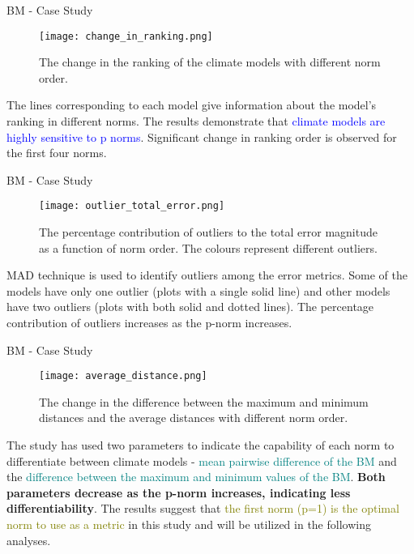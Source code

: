 \documentclass[xcolor={dvipsnames}]{beamer}
\begin{document}
\begin{frame}{BM - Case Study}
\begin{minipage}{0.5\textwidth}
\begin{figure}
    \centering
    \texttt{[image: change\_in\_ranking.png]}
    \captionsetup{font=scriptsize} 
    \caption{The change in the ranking of the climate models with different norm order.}
    \label{fig:change_in_ranking}
\end{figure}
\end{minipage}%
\begin{minipage}{0.5\textwidth}
The lines corresponding to each model give information about the model’s ranking in different norms. The results demonstrate that \textcolor{blue}{climate models are highly sensitive to p norms}. Significant change in ranking order is observed for the first four norms.
\end{minipage}
\end{frame}

\begin{frame}{BM - Case Study}

\begin{figure}
  \centering
  \texttt{[image: outlier\_total\_error.png]}
  \captionsetup{font=scriptsize, skip=0pt, belowskip=-10pt}  
  \caption{The percentage contribution of outliers to the total error magnitude as a function of norm order. The colours represent different outliers.}
  \label{fig:outlier_total_error}
\end{figure}

MAD technique is used to identify outliers among the error metrics. Some of the models have only one outlier (plots with a single solid line) and other models have two outliers (plots with both solid and dotted lines). The percentage contribution of outliers increases as the p-norm increases.

\end{frame}

\begin{frame}{BM - Case Study}
\begin{minipage}{0.5\textwidth}
\begin{figure}
    \centering
    \texttt{[image: average\_distance.png]}
    \captionsetup{font=scriptsize} 
    \caption{The change in the difference between the maximum and minimum distances and the average distances with different norm order.}
    \label{fig:average_distance}
\end{figure}
\end{minipage}%
\begin{minipage}{0.5\textwidth}
The study has used two parameters to indicate the capability of each norm to differentiate between climate models - \textcolor{teal}{mean pairwise difference of the BM} and the \textcolor{teal}{difference between the maximum and minimum values of the BM}. \textbf{Both parameters decrease as the p-norm increases, indicating less differentiability}. The results suggest that \textcolor{olive}{the first norm (p=1) is the optimal norm to use as a metric} in this study and will be utilized in the following analyses.
\end{minipage}
\end{frame}
\end{document}
